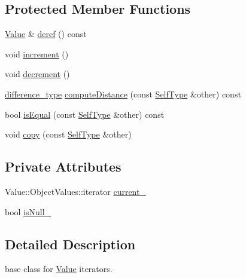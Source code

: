 \subsection*{Protected Member Functions}
\begin{DoxyCompactItemize}
\item 
\hyperlink{class_json_1_1_value}{Value} \& \hyperlink{class_json_1_1_value_iterator_base_aa5b75c9514a30ba2ea3c9a35c165c18e}{deref} () const
\item 
void \hyperlink{class_json_1_1_value_iterator_base_afe58f9534e1fd2033419fd9fe244551e}{increment} ()
\item 
void \hyperlink{class_json_1_1_value_iterator_base_affc8cf5ff54a9f432cc693362c153fa6}{decrement} ()
\item 
\hyperlink{class_json_1_1_value_iterator_base_a4e44bf8cbd17ec8d6e2c185904a15ebd}{difference\+\_\+type} \hyperlink{class_json_1_1_value_iterator_base_af11473c9e20d07782e42b52a2f9e4540}{compute\+Distance} (const \hyperlink{class_json_1_1_value_iterator_base_a9d2a940d03ea06d20d972f41a89149ee}{Self\+Type} \&other) const
\item 
bool \hyperlink{class_json_1_1_value_iterator_base_a010b5ad3f3337ae3732e5d7e16ca5e25}{is\+Equal} (const \hyperlink{class_json_1_1_value_iterator_base_a9d2a940d03ea06d20d972f41a89149ee}{Self\+Type} \&other) const
\item 
void \hyperlink{class_json_1_1_value_iterator_base_a496e6aba44808433ec5858c178be5719}{copy} (const \hyperlink{class_json_1_1_value_iterator_base_a9d2a940d03ea06d20d972f41a89149ee}{Self\+Type} \&other)
\end{DoxyCompactItemize}
\subsection*{Private Attributes}
\begin{DoxyCompactItemize}
\item 
Value\+::\+Object\+Values\+::iterator \hyperlink{class_json_1_1_value_iterator_base_ab3138ce8af8301cca3b041ea55cb922a}{current\+\_\+}
\item 
bool \hyperlink{class_json_1_1_value_iterator_base_a3e08b114a1aed9bde518c527f94a8c59}{is\+Null\+\_\+}
\end{DoxyCompactItemize}


\subsection{Detailed Description}
base class for \hyperlink{class_json_1_1_value}{Value} iterators. 



